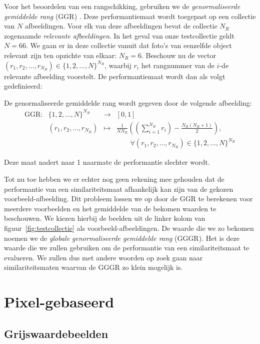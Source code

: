 Voor het beoordelen van een rangschikking, gebruiken we de \emph{genormaliseerde gemiddelde rang} 
(GGR) \cite{muller:perf_eval}. Deze performantiemaat wordt toegepast op een collectie
van $N$ afbeeldingen. Voor elk van deze afbeeldingen bevat de collectie
$N_R$ zogenaamde \emph{relevante afbeeldingen}. In het geval van onze testcollectie geldt $N = 66$.
We gaan er in deze collectie vanuit dat foto's van eenzelfde object relevant zijn ten opzichte
van elkaar: $N_R = 6$. Beschouw nu de vector 
$(r_1,r_2,\ldots,r_{N_R}) \in \{1,2,\ldots,N\}^{N_R}$, waarbij $r_i$ het
rangnummer van de $i$-de relevante afbeelding voorstelt. De performantiemaat
wordt dan als volgt gedefinieerd:
\begin{definitie}
De genormaliseerde gemiddelde rang wordt gegeven door de volgende afbeelding:
$$
\begin{array}{llll}
\textrm{GGR}: 	& \{1,2,\ldots,N\}^{N_R} & \to 	& [0,1] \\
		& (r_1,r_2,\ldots,r_{N_R}) & \mapsto &
	{\displaystyle\frac{1}{N N_R}\left(\left(\sum_{i=1}^{N_R}r_i\right) - \frac{N_R (N_R + 1)}{2}\right)},\\ 
	& & & \qquad \forall (r_1, r_2, ..., r_{N_R}) \in \{1,2,\ldots,N\}^{N_R}
\end{array}
$$
\end{definitie}
\noindent
Deze maat nadert naar 1 naarmate de performantie slechter wordt.

Tot nu toe hebben we er echter nog geen rekening mee gehouden dat de performantie van
een similariteitsmaat afhankelijk kan zijn van de gekozen voorbeeld-afbeelding. Dit probleem lossen we
op door de GGR te berekenen voor meerdere voorbeelden en het gemiddelde van de bekomen waarden
te beschouwen. We kiezen hierbij de beelden uit de linker kolom van 
figuur~\ref{fig:testcollectie} als voorbeeld-afbeeldingen. De waarde die we zo bekomen noemen we de
\emph{globale genormaliseerde gemiddelde rang} (GGGR). Het is deze waarde die we zullen gebruiken
om de performantie van een similariteitsmaat te evalueren. We zullen dus met andere woorden op
zoek gaan naar similariteitsmaten waarvan de GGGR zo klein mogelijk is.


\section{Pixel-gebaseerd}

\subsection{Grijswaardebeelden}

